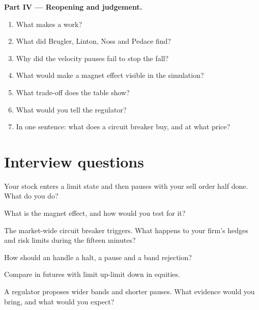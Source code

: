 \begin{problem}
\medskip\noindent\textbf{Part IV --- Reopening and judgement.}
\begin{enumerate}[resume]
\item What makes a  work?
\item What did Brugler, Linton, Noss and Pedace find?
\item Why did the velocity pauses fail to stop the fall?
\item What would make a magnet effect visible in the simulation?
\item What trade-off does the table show?
\item What would you tell the regulator?
\item In one sentence: what does a circuit breaker buy, and at what price?
\end{enumerate}
\end{problem}

\section{Interview questions}

\begin{interviewq}\label{iq:mx:circuit-breakers-and-halts:1}
Your stock enters a limit state and then pauses with your sell order half done. What do you do?
\end{interviewq}

\begin{interviewq}\label{iq:mx:circuit-breakers-and-halts:2}
What is the magnet effect, and how would you test for it?
\end{interviewq}

\begin{interviewq}\label{iq:mx:circuit-breakers-and-halts:3}
The market-wide circuit breaker triggers. What happens to your firm's hedges and risk limits during the fifteen minutes?
\end{interviewq}

\begin{interviewq}\label{iq:mx:circuit-breakers-and-halts:4}
How should an  handle a halt, a pause and a band rejection?
\end{interviewq}

\begin{interviewq}\label{iq:mx:circuit-breakers-and-halts:5}
Compare  in futures with limit up-limit down in equities.
\end{interviewq}

\begin{interviewq}\label{iq:mx:circuit-breakers-and-halts:6}
A regulator proposes wider bands and shorter pauses. What evidence would you bring, and what would you expect?
\end{interviewq}

